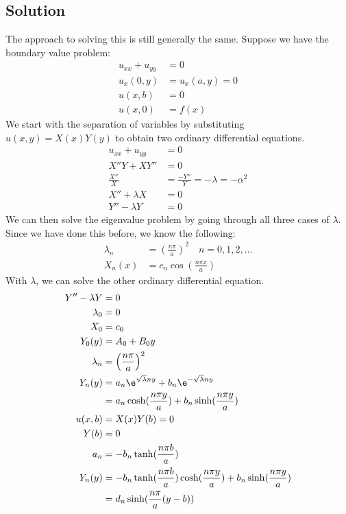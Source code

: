 \documentclass{math}
\begin{document}
\subsection*{Solution}
The approach to solving this is still generally the same. Suppose we have the
boundary value problem:
\begin{align*}
  u_{xx}+u_{yy} &= 0 \\
  u_x(0,y) &= u_x(a,y) = 0 \\
  u(x,b) &= 0 \\
  u(x,0) &= f(x)
\end{align*}
We start with the separation of variables by substituting \( u(x,y) =
X(x)Y(y) \) to obtain two ordinary differential equations.
\begin{align*}
  u_{xx}+u_{yy} &= 0 \\
  X''Y+XY'' &= 0 \\
  \frac{X''}{X} &= \frac{-Y''}{Y} = -\lambda = -\alpha^2 \\
  X''+\lambda X &= 0 \\
  Y''-\lambda Y &= 0
\end{align*}
We can then solve the eigenvalue problem by going through all three cases of
\( \lambda \). Since we have done this before, we know the following:
\begin{align*}
  \lambda_n &= \left(\frac{n\pi}{a}\right)^2 \quad n = 0,1,2,\dots \\
  X_n(x) &= c_n\cos\left(\frac{n\pi x}{a}\right)
\end{align*}
With \( \lambda \), we can solve the other ordinary differential equation.
\begin{align*}
  Y''-\lambda Y &= 0 \\
  \lambda_0 &= 0 \\
  X_0 &= c_0 \\
  Y_0(y) &= A_0+B_0y \\
  \lambda_n &= \left(\frac{n\pi}{a}\right)^2 \\
  Y_n(y) &= a_n\e^{\sqrt{\lambda}ny}+b_n\e^{-\sqrt{\lambda}ny} \\
  &= a_n\cosh(\frac{n\pi y}{a})+b_n\sinh(\frac{n\pi y}{a}) \\
  u(x,b) &= X(x)Y(b) = 0 \\
  Y(b) &= 0 \\
  a_n &= -b_n\tanh(\frac{n\pi b}{a}) \\
  Y_n(y) &= -b_n\tanh(\frac{n\pi b}{a})\cosh(\frac{n\pi y}{a})+
    b_n\sinh(\frac{n\pi y}{a}) \\
  &= d_n\sinh(\frac{n\pi}{a}(y-b))
\end{align*}
\end{document}
